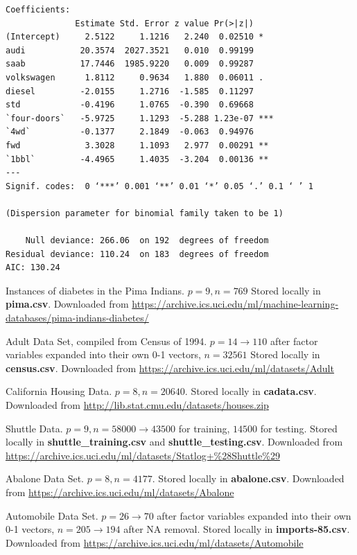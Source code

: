 \documentclass[letter]{article}
\begin{document}

\begin{verbatim}
Coefficients:
              Estimate Std. Error z value Pr(>|z|)    
(Intercept)     2.5122     1.1216   2.240  0.02510 *  
audi           20.3574  2027.3521   0.010  0.99199    
saab           17.7446  1985.9220   0.009  0.99287    
volkswagen      1.8112     0.9634   1.880  0.06011 .  
diesel         -2.0155     1.2716  -1.585  0.11297    
std            -0.4196     1.0765  -0.390  0.69668    
`four-doors`   -5.9725     1.1293  -5.288 1.23e-07 ***
`4wd`          -0.1377     2.1849  -0.063  0.94976    
fwd             3.3028     1.1093   2.977  0.00291 ** 
`1bbl`         -4.4965     1.4035  -3.204  0.00136 ** 
---
Signif. codes:  0 ‘***’ 0.001 ‘**’ 0.01 ‘*’ 0.05 ‘.’ 0.1 ‘ ’ 1

(Dispersion parameter for binomial family taken to be 1)

    Null deviance: 266.06  on 192  degrees of freedom
Residual deviance: 110.24  on 183  degrees of freedom
AIC: 130.24
\end{verbatim}
 


\begin{thebibliography}{99}
    
      Instances of diabetes in the Pima Indians. $p=9, n=769$ Stored locally in \textbf{pima.csv}. Downloaded from \url{https://archive.ics.uci.edu/ml/machine-learning-databases/pima-indians-diabetes/} 
  
     Adult Data Set, compiled from Census of 1994. $p=14 \rightarrow 110$ after factor variables expanded into their own 0-1 vectors, $n=32561$ Stored locally in \textbf{census.csv}. Downloaded from \url{https://archive.ics.uci.edu/ml/datasets/Adult} 
    
     California Housing Data.  $p = 8, n=20640$. Stored locally in \textbf{cadata.csv}. Downloaded from \url{http://lib.stat.cmu.edu/datasets/houses.zip}
	
	 Shuttle Data.  $p = 9, n = 58000 \rightarrow 43500$ for training, $14500$ for testing. Stored locally in \textbf{shuttle\_training.csv} and \textbf{shuttle\_testing.csv}. Downloaded from \url{https://archive.ics.uci.edu/ml/datasets/Statlog+\%28Shuttle\%29}
    
     Abalone Data Set. $p = 8, n = 4177$. Stored locally in \textbf{abalone.csv}. Downloaded from \url{https://archive.ics.uci.edu/ml/datasets/Abalone}
    
     Automobile Data Set. $p = 26 \rightarrow 70$ after factor variables expanded into their own 0-1 vectors, $n = 205 \rightarrow 194$ after NA removal. Stored locally in \textbf{imports-85.csv}. Downloaded from \url{https://archive.ics.uci.edu/ml/datasets/Automobile}
    
\end{thebibliography} 
 
\end{document}

